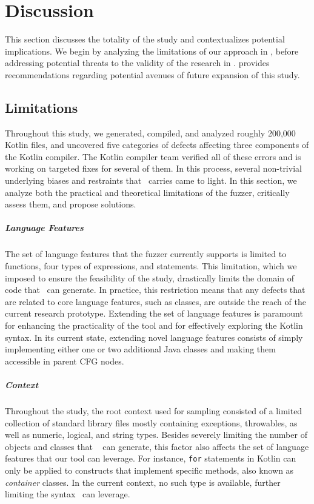 \chapter{\label{cha:discussion}Discussion}

This section discusses the totality of the study and contextualizes
potential implications.
We begin by analyzing the limitations of our approach in ,
before addressing potential threats to the validity of the research in .
 provides recommendations regarding potential 
avenues of future expansion of this study.

\section{\label{sec:limits}Limitations}

Throughout this study, we generated, compiled, and analyzed
roughly 200,000 Kotlin files, and uncovered five categories
of defects affecting three components of the Kotlin compiler.
The Kotlin compiler team verified all of these errors and is
working on targeted fixes for several of them.
In this process, several non-trivial
underlying biases and restraints that
\kf~carries came to light.
In this section, we analyze both the practical and theoretical
limitations of the fuzzer, critically assess them, and propose solutions.

\paragraph{Language Features}
The set of language features that the fuzzer currently supports is limited
to functions, four types of expressions, and statements.
This limitation, which we imposed to ensure the feasibility of the study,
drastically limits the domain of code that \kf~can generate.
In practice, this restriction means that any defects that are related to core language features,
such as classes, are outside the reach of the current research prototype.
Extending the set of language features is paramount for enhancing
the practicality of the tool and for effectively exploring the Kotlin syntax.
In its current state, extending novel language features consists of simply
implementing either one or two additional Java classes and making them accessible
in parent \gls{CFG} nodes.

\paragraph{Context}
Throughout the study, the root context used for sampling
consisted of a limited collection of standard library files mostly containing exceptions,
throwables, as well as numeric, logical, and string types.
Besides severely limiting the number of objects and classes
that \kf~ can generate, this factor also affects the
set of language features that our tool can leverage.
For instance, \texttt{for} statements in Kotlin can only be applied
to constructs that implement specific methods, also known as \textit{container} classes.
In the current context, no such type is available, further limiting the syntax \kf~can leverage.

